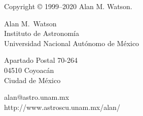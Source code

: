
\noindent
Copyright {\copyright} 1999--2020 Alan M. Watson.


\bigskip
\bigskip

\noindent
Alan M.\ Watson\\
Instituto de Astronomía\\
Universidad Nacional Autónomo de México

\medskip
\noindent
Apartado Postal 70-264\\
04510 Coyoacán\\
Ciudad de México

\medskip
\noindent
alan@astro.unam.mx\\
http://www.astroscu.unam.mx/\raisebox{-3pt}{\~\relax}alan/

\bigskip
\bigskip






